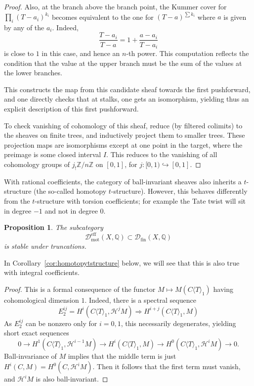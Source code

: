 \documentclass[11pt]{amsart}
\numberwithin{equation}{section}
\numberwithin{theorem}{section}
\newtheorem{proposition}[theorem]{Proposition}
\theoremstyle{definition}
\begin{document}
\begin{proof}
Also, at the branch above the branch point, the Kummer cover for $\prod_i (T-a_i)^{k_i}$ becomes equivalent to the one for $(T-a)^{\sum k_i}$ where $a$ is given by any of the $a_i$. Indeed, 
\[
\frac{T-a_i}{T-a} = 1 + \frac{a-a_i}{T-a_i}
\]
is close to $1$ in this case, and hence an $n$-th power. This computation reflects the condition that the value at the upper branch must be the sum of the values at the lower branches.

This constructs the map from this candidate sheaf towards the first pushforward, and one directly checks that at stalks, one gets an isomorphism, yielding thus an explicit description of this first pushforward.

To check vanishing of cohomology of this sheaf, reduce (by filtered colimits) to the sheaves on finite trees, and inductively project them to smaller trees. These projection maps are isomorphisms except at one point in the target, where the preimage is some closed interval $I$. This reduces to the vanishing of all cohomology groups of $j_! \mathbb Z/n\mathbb Z$ on $[0,1]$, for $j: [0,1)\hookrightarrow [0,1]$.
\end{proof}

With rational coefficients, the category of ball-invariant sheaves also inherits a $t$-structure (the so-called homotopy $t$-structure). However, this behaves differently from the $t$-structure with torsion coefficients; for example the Tate twist will sit in degree $-1$ and not in degree $0$.

\begin{proposition}\label{prop:homotopytstructure} The subcategory
\[
\mathcal D_{\mathrm{mot}}^{\mathrm{eff}}(X,\mathbb Q)\subset \mathcal D_{\mathrm{fin}}(X,\mathbb Q)
\]
is stable under truncations.
\end{proposition}

In Corollary~\ref{cor:homotopytstructure} below, we will see that this is also true with integral coefficients.

\begin{proof} This is a formal consequence of the functor $M\mapsto M(C\langle T\rangle_1)$ having cohomological dimension $1$. Indeed, there is a spectral sequence
\[
E_2^{ij} = H^i(C\langle T\rangle_1,\mathcal H^j M)\Rightarrow H^{i+j}(C\langle T\rangle_1,M)
\]
As $E_2^{ij}$ can be nonzero only for $i=0,1$, this necessarily degenerates, yielding short exact sequences
\[
0\to H^1(C\langle T\rangle_1,\mathcal H^{i-1} M)\to H^i(C\langle T\rangle_1,M)\to H^0(C\langle T\rangle_1,\mathcal H^i M)\to 0.
\]
Ball-invariance of $M$ implies that the middle term is just $H^i(C,M) = H^0(C,\mathcal H^i M)$. Then it follows that the first term must vanish, and $\mathcal H^i M$ is also ball-invariant.
\end{proof}
\end{document}

